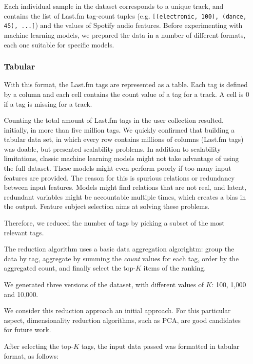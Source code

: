 \documentclass[sn-mathphys]{sn-jnl}%
\theoremstyle{thmstyleone}%
\theoremstyle{thmstyletwo}%
\theoremstyle{thmstylethree}%
\begin{document}
Each individual sample in the dataset corresponds to a unique track,
and contains the list of Last.fm tag-count tuples (e.g. \verb|[(electronic, 100), (dance, 45), ...]|)
and the values of Spotify audio features.
Before experimenting with machine learning models, we prepared the data in a number of different formats,
each one suitable for specific models.


\subsubsection{Tabular}
With this format, the Last.fm tags are represented as a table.
Each tag is defined by a column and each cell contains the count value of a tag for a track.
A cell is 0 if a tag is missing for a track.

Counting the total amount of Last.fm tags in the user collection resulted, initially, in more than five million tags.
We quickly confirmed that building a tabular data set, in which every row contains millions of columns (Last.fm tags)
was doable, but presented scalability problems.
In addition to scalability limitations, classic machine learning models might not take advantage of using the full dataset.
These models might even perform poorly if too many input features are provided.
The reason for this is spurious relations or redundancy  between input features.
Models might find relations that are not real, and latent, redundant variables might be accountable multiple times, which creates a bias in the output.
Feature subject selection aims at solving these problems.


Therefore, we reduced the number of tags by picking a subset of the most relevant tags.

The reduction algorithm uses a basic data aggregation algorightm: group the data by tag, aggregate by summing the \emph{count} values for each tag,
order by the aggregated count, and finally select the top-$K$ items of the ranking.

We generated three versions of the dataset, with different values of $K$: 100, 1,000 and 10,000.

We consider this reduction approach an initial approach.
For this particular aspect, dimensionality reduction algorithms, such as PCA, are good candidates for future work.

After selecting the top-$K$ tags, the input data passed was formatted in tabular format, as follows:
\end{document}

